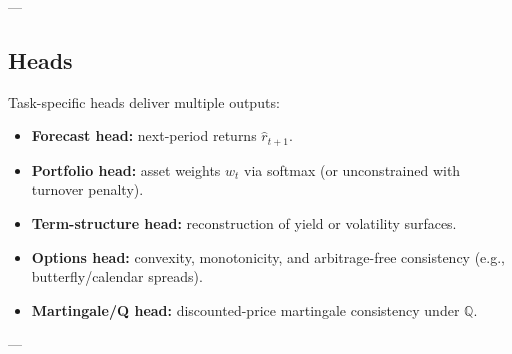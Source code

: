 \documentclass[10pt,twocolumn]{article}
\begin{document}
---

\subsection{Heads}

Task-specific heads deliver multiple outputs:  

\begin{itemize}
    \item \textbf{Forecast head:} next-period returns $\hat r_{t+1}$.  
    \item \textbf{Portfolio head:} asset weights $w_t$ via softmax (or unconstrained with turnover penalty).  
    \item \textbf{Term-structure head:} reconstruction of yield or volatility surfaces.  
    \item \textbf{Options head:} convexity, monotonicity, and arbitrage-free consistency 
    (e.g., butterfly/calendar spreads).  
    \item \textbf{Martingale/Q head:} discounted-price martingale consistency under $\mathbb Q$.  
\end{itemize}

---
\end{document}
